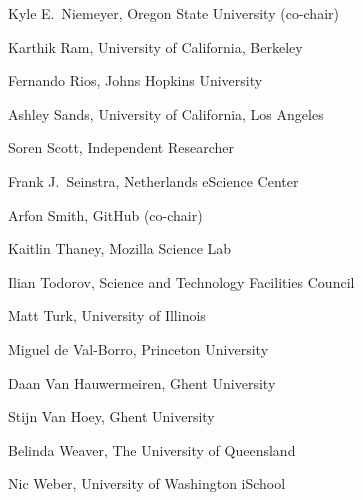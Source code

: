 \documentclass[12pt, oneside]{amsart}
\begin{document}
Kyle E.~Niemeyer, Oregon State University (co-chair)

Karthik Ram, University of California, Berkeley

Fernando Rios, Johns Hopkins University

Ashley Sands, University of California, Los Angeles

Soren Scott, Independent Researcher

Frank J.~Seinstra, Netherlands eScience Center

Arfon Smith, GitHub (co-chair)

Kaitlin Thaney, Mozilla Science Lab

Ilian Todorov, Science and Technology Facilities Council

Matt Turk, University of Illinois

Miguel de Val-Borro, Princeton University

Daan Van Hauwermeiren, Ghent University

Stijn Van Hoey, Ghent University

Belinda Weaver, The University of Queensland

Nic Weber, University of Washington iSchool



\end{document}
